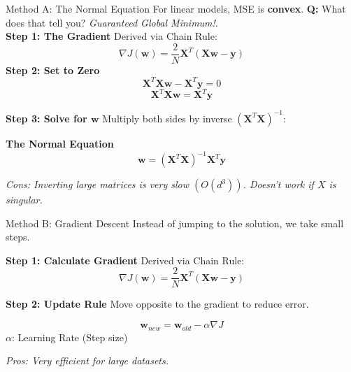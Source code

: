 \begin{frame}{Method A: The Normal Equation}
    For linear models, MSE is \textbf{convex}. \textbf{Q:} What does that tell you? \pause \textit{Guaranteed Global Minimum!}. \\
    \pause
    \textbf{Step 1: The Gradient} Derived via Chain Rule:
    $$ \nabla J(\mathbf{w}) = \frac{2}{N} \mathbf{X}^T(\mathbf{X}\mathbf{w} - \mathbf{y}) $$ 
    \pause    
    \textbf{Step 2: Set to Zero}
    $$ \mathbf{X}^T\mathbf{X}\mathbf{w} - \mathbf{X}^T\mathbf{y} = 0 $$
    $$ \mathbf{X}^T\mathbf{X}\mathbf{w} = \mathbf{X}^T\mathbf{y} $$

    \pause
    
    \textbf{Step 3: Solve for $\mathbf{w}$}
    Multiply both sides by inverse $(\mathbf{X}^T\mathbf{X})^{-1}$:
    \begin{tcolorbox}[colback=blue!5, width=0.45\linewidth, center]
        \centering\textbf{The Normal Equation}
        $$\mathbf{w} = (\mathbf{X}^T\mathbf{X})^{-1} \mathbf{X}^T \mathbf{y}$$
    \end{tcolorbox}
    \small \textit{Cons: Inverting large matrices is very slow $(O(d^3))$. Doesn't work if $X$ is singular.}
\end{frame}

\begin{frame}{Method B: Gradient Descent}
    Instead of jumping to the solution, we take small steps.
    
    \textbf{Step 1: Calculate Gradient}
    Derived via Chain Rule:
    $$ \nabla J(\mathbf{w}) = \frac{2}{N} \mathbf{X}^T(\mathbf{X}\mathbf{w} - \mathbf{y}) $$ 
    
    \textbf{Step 2: Update Rule}
    Move opposite to the gradient to reduce error.
    
    \begin{tcolorbox}[colback=green!5, title=\textbf{Iterative Update}]
        $$ \mathbf{w}_{new} = \mathbf{w}_{old} - \alpha \nabla J $$
        \small $\alpha$: Learning Rate (Step size)
    \end{tcolorbox}
    
    \small \textit{Pros: Very efficient for large datasets.}
\end{frame}


